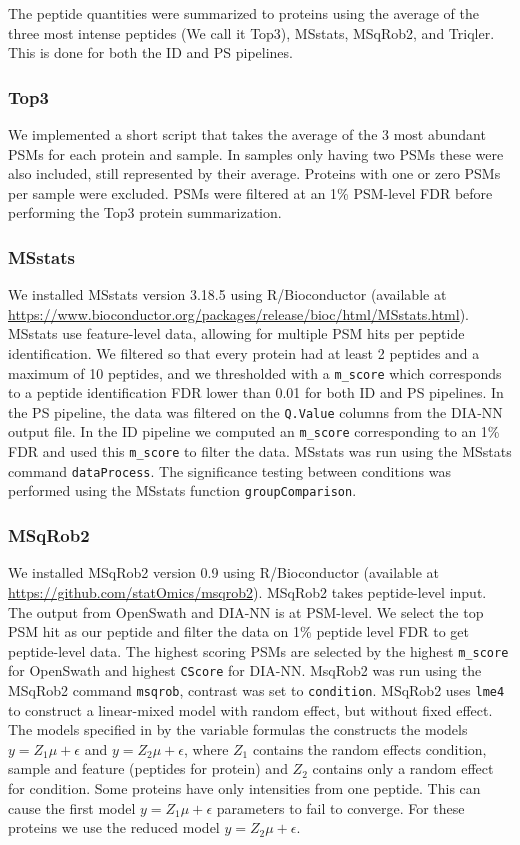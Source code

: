 \documentclass[10pt,letterpaper]{article}
\begin{document}
The peptide quantities were summarized to proteins using the average of the three most intense peptides (We call it Top3), MSstats, MSqRob2, and Triqler. This is done for both the ID and PS pipelines. 

\subsubsection*{Top3}

We implemented a short script that takes the average of the 3 most abundant PSMs for each protein and sample. In samples only having two PSMs these were also included, still represented by their average. Proteins with one or zero PSMs per sample were excluded. PSMs were filtered at an 1\% PSM-level FDR before performing the Top3 protein summarization. 

\subsubsection*{MSstats}

We installed MSstats version 3.18.5 using R/Bioconductor (available at \url{https://www.bioconductor.org/packages/release/bioc/html/MSstats.html}). MSstats use feature-level data, allowing for multiple PSM hits per peptide identification. We filtered so that every protein had at least 2 peptides and a maximum of 10 peptides, and we thresholded with a \texttt{m\_score} which corresponds to a peptide identification FDR lower than 0.01 for both ID and PS pipelines. In the PS pipeline, the data was filtered on the \texttt{Q.Value} columns from the DIA-NN output file. In the ID pipeline we computed an \texttt{m\_score} corresponding to an 1\% FDR and used this \texttt{m\_score} to filter the data. MSstats was run using the MSstats command \texttt{dataProcess}. The significance testing between conditions was performed using the MSstats function \texttt{groupComparison}.  

\subsubsection*{MSqRob2}
%
We installed MSqRob2 version 0.9 using R/Bioconductor (available at \url{https://github.com/statOmics/msqrob2}). MSqRob2 takes peptide-level input. The output from OpenSwath and DIA-NN is at PSM-level. We select the top PSM hit as our peptide and filter the data on 1\% peptide level FDR to get peptide-level data. The highest scoring PSMs are selected by the highest \texttt{m\_score} for OpenSwath and highest \texttt{CScore} for DIA-NN. MsqRob2 was run using the MSqRob2 command \texttt{msqrob},  contrast was set to \texttt{condition}.
MSqRob2 uses \texttt{lme4} to construct a linear-mixed model with random effect, but without fixed effect. The models specified in by the variable formulas the constructs the models $y = Z_1 \mu + \epsilon$ and $y = Z_2 \mu + \epsilon$, where $Z_1$ contains the random effects condition, sample and feature (peptides for protein) and $Z_2$ contains only a random effect for condition. Some proteins have only intensities from one peptide. This can cause the first model $y = Z_1 \mu + \epsilon$ parameters to fail to converge. For these proteins we use the reduced model $y = Z_2 \mu + \epsilon$.
\end{document}
